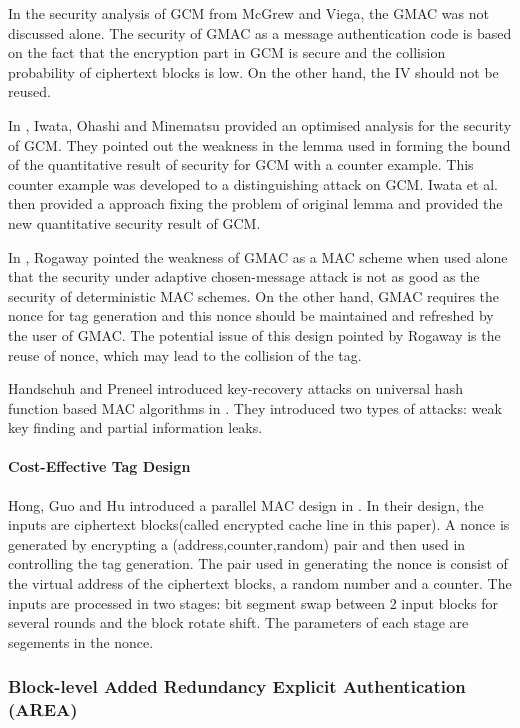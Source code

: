 \documentclass{article}
\begin{document}
In the security analysis of GCM from McGrew and Viega, the GMAC was not discussed alone. The security of GMAC as a message authentication code is based on the fact that the encryption part in GCM is secure and the collision probability of ciphertext blocks is low. On the other hand, the IV should not be reused. 

In \cite{breaking}, Iwata, Ohashi and Minematsu provided an optimised analysis for the security of GCM. They pointed out the weakness in the lemma used in forming the bound of the quantitative result of security for GCM with a counter example. This counter example was developed to a distinguishing attack on GCM. Iwata et al. then provided a approach fixing the problem of original lemma and provided the new quantitative security result of GCM. 

In \cite{Rogaway2011}, Rogaway pointed the weakness of GMAC as a MAC scheme when used alone that the security under adaptive chosen-message attack is not as good as the security of deterministic MAC schemes. On the other hand, GMAC requires the nonce for tag generation and this nonce should be maintained and refreshed by the user of GMAC. The potential issue of this design pointed by Rogaway is the reuse of nonce, which may lead to the collision of the tag. 

Handschuh and Preneel introduced key-recovery attacks on universal hash function based MAC algorithms in \cite{key_recover}. They introduced two types of attacks: weak key finding and partial information leaks.

\paragraph{Cost-Effective Tag Design}
Hong, Guo and Hu introduced a parallel MAC design in \cite{cetd}.
In their design, the inputs are ciphertext blocks(called encrypted cache line in this paper). A nonce is generated by encrypting a (address,counter,random) pair and then used in controlling the tag generation. The pair used in generating the nonce is consist of the virtual address of the ciphertext blocks, a random number and a counter. The inputs are processed in two stages: bit segment swap between 2 input blocks for several rounds and the block rotate shift. The parameters of each stage are segements in the nonce.
\subsubsection{Block-level Added Redundancy Explicit Authentication (AREA)}
\end{document}
